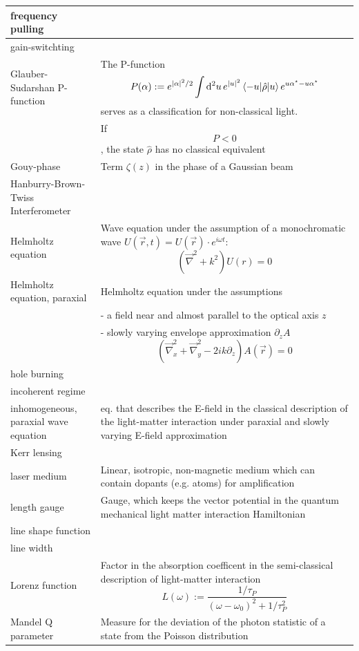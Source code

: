 \documentclass{article}
\newcommand{\diff}{\mathrm{d}}
\newcommand{\lr}[1]{\left(#1\right)}
\begin{document}
\begin{xltabular}{\linewidth}{p{6cm}|X}
	\hline
		frequency pulling &  \\
	\hline
		gain-switchting &  \\
	\hline
		Glauber-Sudarshan P-function & The P-function
			$$P(\alpha) := e^{|\alpha|^2 / 2} \int \diff^2 u \, e^{|u|^2} \braket{ -u | \hat{\rho} | u } e^{u \alpha^\star - u \alpha^\star}$$ 
		serves as a classification for non-classical light.\\
		& If 
			$$P<0$$,
		the state $\hat{\rho}$ has no classical equivalent \\
	\hline
		Gouy-phase & Term $\zeta(z)$ in the phase of a Gaussian beam \\
	\hline
		Hanburry-Brown-Twiss Interferometer &  \\
	\hline
		Helmholtz equation & Wave equation under the assumption of a monochromatic wave $U(\vec{r},t) = U(\vec{r}) \cdot e^{i\omega t}$:
			$$\lr{ \vec{\nabla}^2 + k^2 } U(r) = 0$$ \\
	\hline
		Helmholtz equation, paraxial & Helmholtz equation under the assumptions \\
		& - a field near and almost parallel to the optical axis $z$ \\
		& - slowly varying envelope approximation $\partial_z A$
			$$\lr{ \vec{\nabla}_x^2 + \vec{\nabla}_y^2 -2ik \partial_z } A(\vec{r}) = 0$$ \\
	\hline
		hole burning &  \\
	\hline
		incoherent regime &  \\
	\hline
		inhomogeneous, paraxial wave equation & eq. that describes the E-field in the classical description of the light-matter interaction under paraxial and slowly varying E-field approximation \\
	\hline
		Kerr lensing &  \\
	\hline
		laser medium & Linear, isotropic, non-magnetic medium which can contain dopants (e.g. atoms) for amplification \\
	\hline
		length gauge & Gauge, which keeps the vector potential in the quantum mechanical light matter interaction Hamiltonian \\
	\hline
		line shape function &  \\
	\hline
		line width &  \\
	\hline
		Lorenz function & Factor in the absorption coefficent in the semi-classical description of light-matter interaction
			$$L(\omega) := \frac{1/\tau_P}{ (\omega - \omega_0)^2 + 1/\tau_P^2 }$$ \\
	\hline
		Mandel Q parameter & Measure for the deviation of the photon statistic of a state from the Poisson distribution

\end{xltabular}
\end{document}
